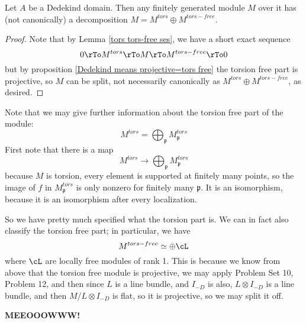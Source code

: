 \documentclass[12 pt]{article}
\theoremstyle{definition}
\newcommand\fp{{\mathfrak p}}
\begin{document}
\begin{proposition}
Let $A$ be a Dedekind domain. Then any finitely generated module $M$ over it has (not canonically) a decomposition $M=M^{tors} \oplus M^{tors-free}$.
\end{proposition}
\begin{proof}
Note that by Lemma \ref{tors tors-free ses}, we have a short exact sequence
\[ 0 \rTo M^{tors} \rTo M \rTo M^{tors-free} \rTo 0\]
but by proposition \ref{Dedekind means projective=tors free} the torsion free part is projective, so $M$ can be split, not necessarily canonically as  $M^{tors} \oplus M^{tors-free}$, as desired.
\end{proof}

Note that we may give further information about the torsion free part of the module:
\[M^{tors}=\bigoplus_{\fp} M_{\fp}^{tors}\]
First note that there is a map
\[M^{tors} \to \bigoplus_{\fp} M_{\fp}^{tors}\]
because $M$ is torsion, every element is supported at finitely many points, so the image of $f$ in $M^{tors}_\fp$ is only nonzero for finitely many $\fp$.
It is an isomorphism, because it is an isomorphism after every localization.

So we have pretty much specified what the torsion part is. We can in fact also classify the torsion free part;  in particular, we have
\[M^{tors-free} \simeq \oplus \cL\]
where $\cL$ are locally free modules of rank 1.
This is because we know from above that the torsion free module is projective, we may apply Problem Set 10, Problem 12, and then since $L$ is a line bundle, and $I_{-D}$ is also, $L \otimes I_{-D}$ is a line bundle, and then $M/L \otimes I_{-D}$ is flat, so it is projective, so we may split it off.


\textcolor[rgb]{1.00,0.00,0.00}{\textbf{MEEOOOWWW!}}
\end{document}
